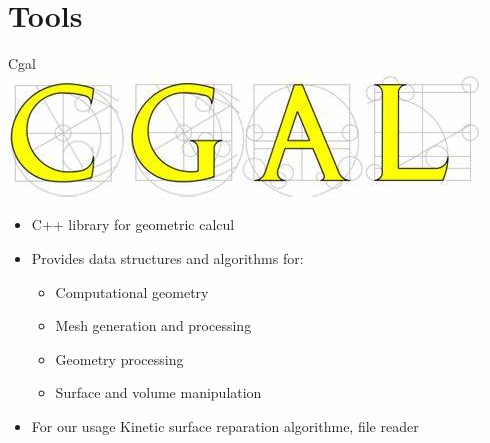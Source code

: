 \documentclass[10pt]{beamer}
\begin{document}
\section{Tools}
\begin{frame}{Cgal}
    \includegraphics[scale = 0.2]{../../images/CGAL_logo.png}
    \begin{itemize}
        \item C++ library for geometric calcul 
        \item Provides data structures and algorithms for:
        \begin{itemize}
            \item Computational geometry
            \item Mesh generation and processing
            \item Geometry processing
            \item Surface and volume manipulation
        \end{itemize}
        \item For our usage Kinetic surface reparation algorithme, file reader
    \end{itemize}
\end{frame}
\end{document}
